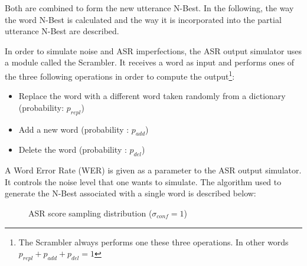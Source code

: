 					Both are combined to form the new utterance N-Best. In the following, the way the word N-Best is calculated and the way it is incorporated into the partial utterance N-Best are described.
					
					In order to simulate noise and ASR imperfections, the ASR output simulator uses a module called the Scrambler. It receives a word as input and performs ones of the three following operations in order to compute the output\footnote{The Scrambler always performs one these three operations. In other words $p_{repl} + p_{add} + p_{del} = 1$}:
					
					\begin{itemize}
						\item Replace the word with a different word taken randomly from a dictionary (probability: $p_{repl}$)
						\item Add a new word (probability : $p_{add}$)
						\item Delete the word (probability : $p_{del}$)
					\end{itemize}
					
					A Word Error Rate (WER) is given as a parameter to the ASR output simulator. It controls the noise level that one wants to simulate. The algorithm used to generate the N-Best associated with a single word is described below:
					
					\begin{figure}[t]
					\centering
					\caption{ASR score sampling distribution ($\sigma_{conf} = 1$)}
					\label{fig:scoresample}
			\end{figure}
			
